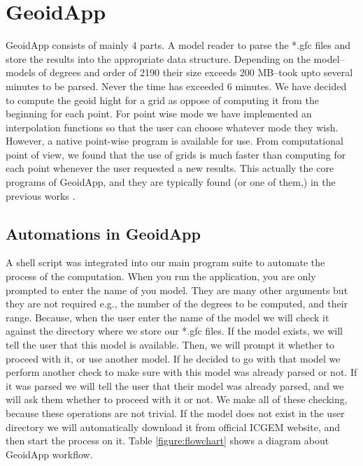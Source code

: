 \section{GeoidApp}

GeoidApp consists of mainly 4 parts. A model reader to parse the *.gfc files and store the results into the appropriate data structure. Depending on the model--models of degrees and order of 2190 their size exceeds 200 MB--took upto several minutes to be parsed. Never the time has exceeded 6 minutes. We have decided to compute the geoid hight for a grid as oppose of computing it from the beginning for each point. For point wise mode we have implemented an interpolation functions so that the user can choose whatever mode they wish. However, a native point-wise program is available for use. From computational point of view, we found that the use of grids is much faster than computing for each point whenever the user requested a new results. This actually the core programs of GeoidApp, and they are typically found (or one of them,) in the previous works \cite{egmlab, icgem, geographiclib}. 

\subsection{Automations in GeoidApp}

A shell script was integrated into our main program suite to automate the process of the computation. When you run the application, you are only prompted to enter the name of you model. They are many other arguments but they are not required e.g., the number of the degrees to be computed, and their range. Because, when the user enter the name of the model we will check it against the directory where we store our *.gfc files. If the model exists, we will tell the user that this model is available. Then, we will prompt it whether to proceed with it, or use another model. If he decided to go with that model we perform another check to make sure with this model was already parsed or not. If it was parsed we will tell the user that their model was already parsed, and we will ask them whether to proceed with it or not. We make all of these checking, because these operations are not trivial. If the model does not exist in the user directory we will automatically download it from official ICGEM website, and then start the process on it. Table \ref{figure:flowchart} shows a diagram about GeoidApp workflow.

